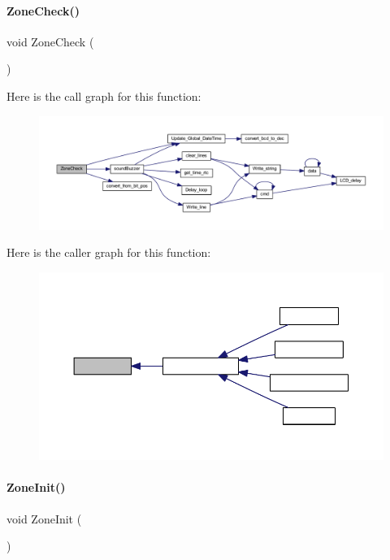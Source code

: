 \paragraph{Zone\+Check()}
{\footnotesize\ttfamily void Zone\+Check (\begin{DoxyParamCaption}{ }\end{DoxyParamCaption})}

Here is the call graph for this function\+:
\nopagebreak
\begin{figure}[H]
\begin{center}
\leavevmode
\includegraphics[width=350pt]{a00059_aefe3a1f3ce1ce2aef86b493a3331bf2e_cgraph}
\end{center}
\end{figure}
Here is the caller graph for this function\+:
\nopagebreak
\begin{figure}[H]
\begin{center}
\leavevmode
\includegraphics[width=350pt]{a00059_aefe3a1f3ce1ce2aef86b493a3331bf2e_icgraph}
\end{center}
\end{figure}
\mbox{\label{a00059_aad1cb50e4ddc412138066d4c3b4d9529}} 
\paragraph{Zone\+Init()}
{\footnotesize\ttfamily void Zone\+Init (\begin{DoxyParamCaption}{ }\end{DoxyParamCaption})}

